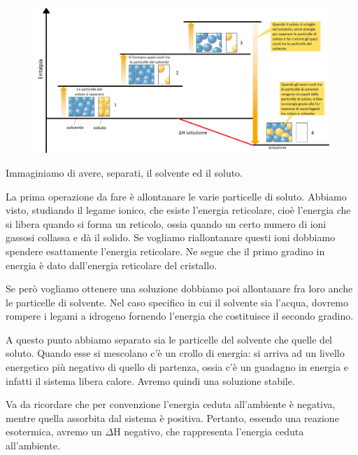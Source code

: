 \begin{figure}[htp]
    \centering
    \includegraphics[width=15cm]{immagini/processo_di_soluzione.png}
\end{figure}

Immaginiamo di avere, separati, il solvente ed il soluto.

La prima operazione da fare è allontanare le varie particelle di soluto. Abbiamo visto, studiando il legame ionico, che esiste l'energia reticolare, cioè l'energia che si libera quando si forma un reticolo, ossia quando un certo numero di ioni gassosi collassa e dà il solido. Se vogliamo riallontanare questi ioni dobbiamo spendere esattamente l'energia reticolare. Ne segue che il primo gradino in energia è dato dall'energia reticolare del cristallo.

Se però vogliamo ottenere una soluzione dobbiamo poi allontanare fra loro anche le particelle di solvente. Nel caso specifico in cui il solvente sia l'acqua, dovremo rompere i legami a idrogeno fornendo l'energia che costituisce il secondo gradino.

A questo punto abbiamo separato sia le particelle del solvente che quelle del soluto. Quando esse si mescolano c'è un crollo di energia: si arriva ad un livello energetico più negativo di quello di partenza, ossia c'è un guadagno in energia e infatti il sistema libera calore. Avremo quindi una soluzione stabile.

Va da ricordare che per convenzione l'energia ceduta all'ambiente è negativa, mentre quella assorbita dal sistema è positiva. Pertanto, essendo una reazione esotermica, avremo un $\Delta$H negativo, che rappresenta l'energia ceduta all'ambiente.
